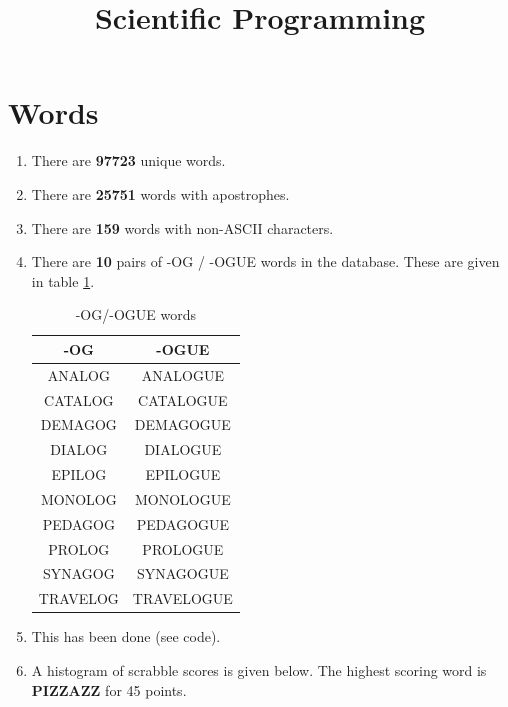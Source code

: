 \documentclass{article}
\begin{document}
\title{Scientific Programming}

\maketitle

\section{Words}

\begin{enumerate}

\item There are \textbf{97723} unique words.

\item There are \textbf{25751} words with apostrophes.

\item There are \textbf{159} words with non-ASCII characters.

\item There are \textbf{10} pairs of -OG / -OGUE words in the database. These are given in table \ref{tab:og}.

\begin{table}[h]
\centering
\begin{tabular}{ |c|c|}
\hline
-OG & -OGUE  \\
\hline
ANALOG & ANALOGUE \\
CATALOG & CATALOGUE \\
DEMAGOG & DEMAGOGUE \\
DIALOG & DIALOGUE \\
EPILOG & EPILOGUE \\
MONOLOG & MONOLOGUE \\
PEDAGOG & PEDAGOGUE \\
PROLOG & PROLOGUE \\
SYNAGOG & SYNAGOGUE \\
TRAVELOG & TRAVELOGUE \\
\hline

\end{tabular}
\caption{-OG/-OGUE words}
\label{tab:og}
\end{table}

\item This has been done (see code).

\item A histogram of scrabble scores is given below. The highest scoring word is \textbf{PIZZAZZ} for 45 points.

\begin{figure}[h]
\centering


\end{figure}
\end{enumerate}
\end{document}
